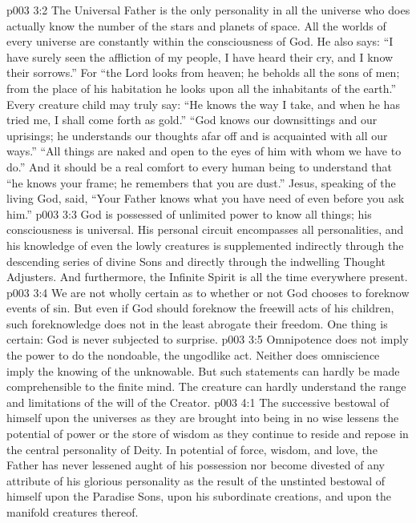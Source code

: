 \vs p003 3:2 The Universal Father is the only personality in all the universe who does actually know the number of the stars and planets of space. All the worlds of every universe are constantly within the consciousness of God. He also says: “I have surely seen the affliction of my people, I have heard their cry, and I know their sorrows.” For “the Lord looks from heaven; he beholds all the sons of men; from the place of his habitation he looks upon all the inhabitants of the earth.” Every creature child may truly say: “He knows the way I take, and when he has tried me, I shall come forth as gold.” “God knows our downsittings and our uprisings; he understands our thoughts afar off and is acquainted with all our ways.” “All things are naked and open to the eyes of him with whom we have to do.” And it should be a real comfort to every human being to understand that “he knows your frame; he remembers that you are dust.” Jesus, speaking of the living God, said, “Your Father knows what you have need of even before you ask him.”
\vs p003 3:3 God is possessed of unlimited power to know all things; his consciousness is universal. His personal circuit encompasses all personalities, and his knowledge of even the lowly creatures is supplemented indirectly through the descending series of divine Sons and directly through the indwelling Thought Adjusters. And furthermore, the Infinite Spirit is all the time everywhere present.
\vs p003 3:4 We are not wholly certain as to whether or not God chooses to foreknow events of sin. But even if God should foreknow the freewill acts of his children, such foreknowledge does not in the least abrogate their freedom. One thing is certain: God is never subjected to surprise.\plusone
\pc \vs p003 3:5 Omnipotence does not imply the power to do the nondoable, the ungodlike act. Neither does omniscience imply the knowing of the unknowable. But such statements can hardly be made comprehensible to the finite mind. The creature can hardly understand the range and limitations of the will of the Creator.
\vs p003 4:1 The successive bestowal of himself upon the universes as they are brought into being in no wise lessens the potential of power or the store of wisdom as they continue to reside and repose in the central personality of Deity. In potential of force, wisdom, and love, the Father has never lessened aught of his possession nor become divested of any attribute of his glorious personality as the result of the unstinted bestowal of himself upon the Paradise Sons, upon his subordinate creations, and upon the manifold creatures thereof.
